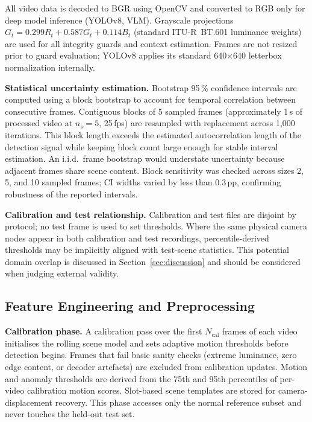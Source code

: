 \documentclass[a4paper,fleqn]{cas-dc}
\begin{document}
All video data is decoded to BGR using OpenCV and converted to RGB only for deep model inference (YOLOv8, VLM). Grayscale projections $G_t = 0.299R_t + 0.587G_t + 0.114B_t$ (standard ITU-R~BT.601 luminance weights) are used for all integrity guards and context estimation. Frames are not resized prior to guard evaluation; YOLOv8 applies its standard 640$\times$640 letterbox normalization internally.
 
\textbf{Statistical uncertainty estimation.}
Bootstrap 95\,\% confidence intervals are computed using a block bootstrap to account for temporal correlation between consecutive frames. Contiguous blocks of 5 sampled frames (approximately 1\,s of processed video at $n_s{=}5$, 25\,fps) are resampled with replacement across 1{,}000 iterations. This block length exceeds the estimated autocorrelation length of the detection signal while keeping block count large enough for stable interval estimation. An i.i.d.\ frame bootstrap would understate uncertainty because adjacent frames share scene content. Block sensitivity was checked across sizes 2, 5, and 10 sampled frames; CI widths varied by less than 0.3\,pp, confirming robustness of the reported intervals.
 
\textbf{Calibration and test relationship.} Calibration and test files are disjoint by protocol; no test frame is used to set thresholds. Where the same physical camera nodes appear in both calibration and test recordings, percentile-derived thresholds may be implicitly aligned with test-scene statistics. This potential domain overlap is discussed in Section~\ref{sec:discussion} and should be considered when judging external validity.
 
\FloatBarrier
\subsection{Feature Engineering and Preprocessing}
 
\textbf{Calibration phase.} A calibration pass over the first $N_{\text{cal}}$ frames of each video initialises the rolling scene model and sets adaptive motion thresholds before detection begins. Frames that fail basic sanity checks (extreme luminance, zero edge content, or decoder artefacts) are excluded from calibration updates. Motion and anomaly thresholds are derived from the 75th and 95th percentiles of per-video calibration motion scores. Slot-based scene templates are stored for camera-displacement recovery. This phase accesses only the normal reference subset and never touches the held-out test set.
 
\end{document}
